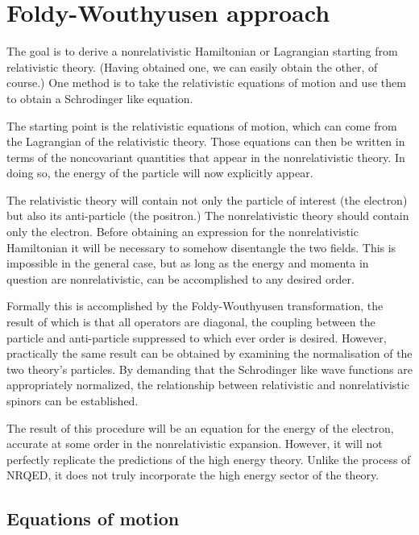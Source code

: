  \section{Foldy-Wouthyusen approach}
 
The goal is to derive a nonrelativistic Hamiltonian or Lagrangian starting from relativistic theory.  (Having obtained one, we can easily obtain the other, of course.)  One method is to take the relativistic equations of motion and use them to obtain a Schrodinger like equation.

The starting point is the relativistic equations of motion, which can come from the Lagrangian of the relativistic theory.  Those equations can then be written in terms of the noncovariant quantities that appear in the nonrelativistic theory.  In doing so, the energy of the particle will now explicitly appear.

The relativistic theory will contain not only the particle of interest (the electron) but also its anti-particle (the positron.)  The nonrelativistic theory should contain only the electron.  Before obtaining an expression for the nonrelativistic Hamiltonian it will be necessary to somehow disentangle the two fields.  This is impossible in the general case, but as long as the energy and momenta in question are nonrelativistic, can be accomplished to any desired order.

Formally this is accomplished by the Foldy-Wouthyusen transformation, the result of which is that all operators are diagonal, the coupling between the particle and anti-particle suppressed to which ever order is desired.  However, practically the same result can be obtained by examining the normalisation of the two theory's particles.  By demanding that the Schrodinger like wave functions are appropriately normalized, the relationship between relativistic and nonrelativistic spinors can be established.

The result of this procedure will be an equation for the energy of the electron, accurate at some order in the nonrelativistic expansion.  However, it will not perfectly replicate the predictions of the high energy theory.  Unlike the process of NRQED, it does not truly incorporate the high energy sector of the theory.



\subsection{Equations of motion}

